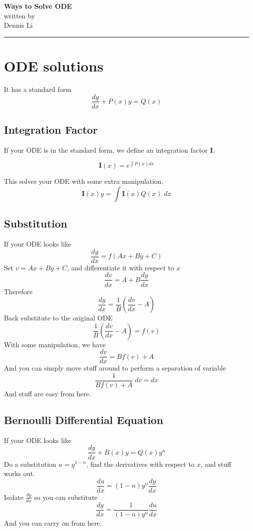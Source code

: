 \documentclass[12pt]{article}
\newcommand{\dydx}[2]{\frac{d #1}{d #2}}
\newcommand{\paren}[1]{\left( #1 \right)}
\newif\ifshow
\begin{document}
\begin{center}
\ifshow
  \textbf{\Large Ways to Solve ODE}\\
\else
  \textbf{\Large Ways to Solve ODE}\\
\fi
written by \\ Dennis Li\\
\end{center}

\hrule

\vspace{0.2cm}

\section{ODE solutions}
It has a standard form
\[
\dydx{y}{x} + P(x)y = Q(x)
\]
\subsection{Integration Factor}
If your ODE is in the standard form, we define an integration factor \textbf{I}.
\begin{Large}
    \[
    \mathbf{I}(x) = e^{\int P(x)dx}
    \]
\end{Large}
This solves your ODE with some extra manipulation. 
\[
\mathbf{I}(x)y = \int \mathbf{I}(x)Q(x)\;dx
\]

\subsection{Substitution}
If your ODE looks like
\[
\dydx{y}{x} = f(Ax+By+C)
\]
Set $v = Ax+By+C$, and differentiate it with respect to $x$
\[
\dydx{v}{x} = A + B\dydx{y}{x}
\]
Therefore
\[
\dydx{y}{x} = \frac{1}{B}\paren{\dydx{v}{x}-A}
\]
Back substitute to the original ODE
\[
\frac{1}{B}\paren{\dydx{v}{x}-A} = f(v)
\]
With some manipulation, we have
\[
\dydx{v}{x} = Bf(v) + A
\]
And you can simply move stuff around to perform a separation of variable
\[
\frac{1}{Bf(v) + A}\; dv = dx
\]
And stuff are easy from here. 

\subsection{Bernoulli Differential Equation}
If your ODE looks like
\[
\dydx{y}{x}+ B(x)y = Q(x)y^n
\]
Do a substitution $u=y^{1-n}$, find the derivatives with respect to $x$, and stuff works out.
\[
\dydx{u}{x} = \paren{1-n}y^n\dydx{y}{x}
\]
Isolate $\dydx{y}{x}$ so you can substitute
\[
\dydx{y}{x} = \frac{1}{(1-n)y^n}\dydx{u}{x}
\]
And you can carry on from here.
\end{document}
